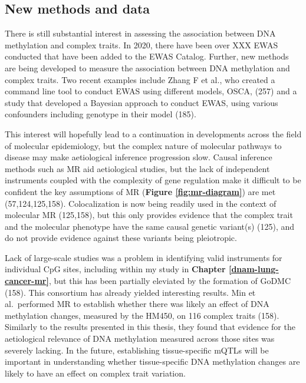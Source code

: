 \documentclass[11pt,oneside]{bristolthesis}
\begin{document}
\hypertarget{new-methods-and-data}{%
\subsection{New methods and data}\label{new-methods-and-data}}

There is still substantial interest in assessing the association between DNA methylation and complex traits. In 2020, there have been over XXX EWAS conducted that have been added to the EWAS Catalog. Further, new methods are being developed to measure the association between DNA methylation and complex traits. Two recent examples include Zhang F et al., who created a command line tool to conduct EWAS using different models, OSCA, (257) and a study that developed a Bayesian approach to conduct EWAS, using various confounders including genotype in their model (185).

This interest will hopefully lead to a continuation in developments across the field of molecular epidemiology, but the complex nature of molecular pathways to disease may make aetiological inference progression slow. Causal inference methods such as MR aid aetiological studies, but the lack of independent instruments coupled with the complexity of gene regulation make it difficult to be confident the key assumptions of MR (\textbf{Figure \ref{fig:mr-diagram}}) are met (57,124,125,158). Colocalization is now being readily used in the context of molecular MR (125,158), but this only provides evidence that the complex trait and the molecular phenotype have the same causal genetic variant(s) (125), and do not provide evidence against these variants being pleiotropic.

Lack of large-scale studies was a problem in identifying valid instruments for individual CpG sites, including within my study in \textbf{Chapter \ref{dnam-lung-cancer-mr}}, but this has been partially eleviated by the formation of GoDMC (158). This consortium has already yielded interesting results. Min et al.~performed MR to establish whether there was likely an effect of DNA methylation changes, measured by the HM450, on 116 complex traits (158). Similarly to the results presented in this thesis, they found that evidence for the aetiological relevance of DNA methylation measured across those sites was severely lacking. In the future, establishing tissue-specific mQTLs will be important in understanding whether tissue-specific DNA methylation changes are likely to have an effect on complex trait variation.
\end{document}
